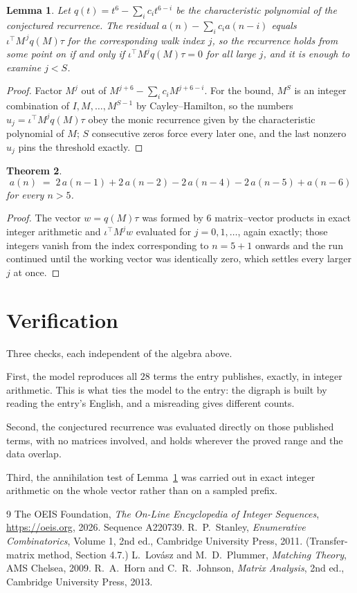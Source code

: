 \documentclass[11pt,a4paper]{article}
\theoremstyle{plain}
\newtheorem{theorem}{Theorem}
\newtheorem{lemma}[theorem]{Lemma}
\theoremstyle{definition}
\begin{document}
\begin{lemma}\label{lem:crit}
Let $q(t)=t^{6}-\sum_i c_it^{6-i}$ be the characteristic polynomial of the
conjectured recurrence. The residual $a(n)-\sum_ic_ia(n-i)$ equals
$\iota^{\!\top}M^{\,j}q(M)\tau$ for the corresponding walk index $j$, so the recurrence
holds from some point on if and only if $\iota^{\!\top}M^{j}q(M)\tau=0$ for all large $j$,
and it is enough to examine $j<S$.
\end{lemma}

\begin{proof}
Factor $M^{j}$ out of $M^{j+6}-\sum_ic_iM^{j+6-i}$. For the bound, $M^{S}$
is an integer combination of $I,M,\dots,M^{S-1}$ by Cayley--Hamilton, so the numbers
$u_j=\iota^{\!\top}M^{j}q(M)\tau$ obey the monic recurrence given by the characteristic
polynomial of $M$; $S$ consecutive zeros force every later one, and the last nonzero $u_j$
pins the threshold exactly.
\end{proof}

\begin{theorem}
\[
a(n)\;=\;2\,a(n-1) + 2\,a(n-2) - 2\,a(n-4) - 2\,a(n-5) + a(n-6)
\]
for every $n>5$.
\end{theorem}

\begin{proof}
The vector $w=q(M)\tau$ was formed by $6$ matrix--vector products in exact integer
arithmetic and $\iota^{\!\top}M^{j}w$ evaluated for $j=0,1,\dots$, again exactly; those
integers vanish from the index corresponding to $n=5+1$ onwards and the run continued
until the working vector was identically zero, which settles every larger $j$ at once.
\end{proof}

\section{Verification}

Three checks, each independent of the algebra above.

First, the model reproduces all $28$ terms the entry publishes, exactly, in integer
arithmetic. This is what ties the model to the entry: the digraph is built by reading the
entry's English, and a misreading gives different counts.

Second, the conjectured recurrence was evaluated directly on those published terms, with no
matrices involved, and holds wherever the proved range and the data overlap.

Third, the annihilation test of Lemma~\ref{lem:crit} was carried out in exact integer
arithmetic on the whole vector rather than on a sampled prefix.

\begin{thebibliography}{9}
 The OEIS Foundation, \emph{The On-Line Encyclopedia of Integer
Sequences}, \url{https://oeis.org}, 2026. Sequence A220739.
 R.~P.~Stanley, \emph{Enumerative Combinatorics}, Volume 1, 2nd ed.,
Cambridge University Press, 2011. (Transfer-matrix method, Section 4.7.)
 L.~Lov\'asz and M.~D.~Plummer, \emph{Matching Theory}, AMS Chelsea,
2009.
 R.~A.~Horn and C.~R.~Johnson, \emph{Matrix Analysis}, 2nd ed., Cambridge
University Press, 2013.
\end{thebibliography}
\end{document}
